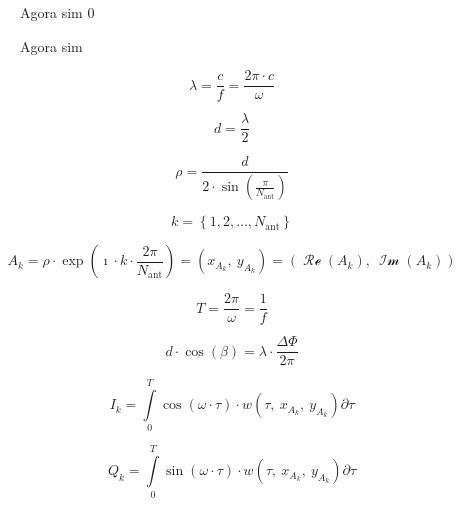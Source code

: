 
\begin{figure}[H]
    \centering
    
    \caption{Agora sim 0}
\end{figure}

\begin{figure}[H]
    \centering
    
    \caption{Agora sim}
\end{figure}

\begin{equation} %
    \lambda = \frac{c}{f} = \frac{2\pi \cdot c}{\omega}
\end{equation}

\begin{equation} %
    d = \frac{\lambda}{2}
\end{equation}

\begin{equation} %
	\rho = \frac{d}{2\cdot \sin\left(\frac{\pi}{N_\text{ant}}\right)}
\end{equation}

\begin{equation} %
	k = \left\{1, 2, \dotsc, N_\text{ant}\right\}
\end{equation}

\begin{equation} %
	A_k =
    \rho \cdot \exp\left(\imath\cdot k \cdot \frac{2\pi}{N_\text{ant}}\right) =
    \left( x_{A_k},~ y_{A_k} \right) =
    \left( \operatorname{\mathcal{Re}}\left( A_k \right), ~\operatorname{\mathcal{Im}}\left( A_k \right) \right)
\end{equation}

\begin{equation} %
    T = \frac{2\pi}{\omega} = \frac{1}{f}
\end{equation}

\begin{equation} %
    d \cdot \cos\left(\beta\right) = \lambda \cdot \frac{\Delta\Phi}{2 \pi}
\end{equation}

\begin{equation} %
    I_k = \int\limits_0^T \cos\left(\omega\cdot\tau\right) \cdot w\left( \tau, ~x_{A_k}, ~y_{A_k} \right) \partial \tau
\end{equation}

\begin{equation} %
    Q_k = \int\limits_0^T \sin\left(\omega\cdot\tau\right) \cdot w\left( \tau, ~x_{A_k}, ~y_{A_k} \right) \partial \tau
\end{equation}

